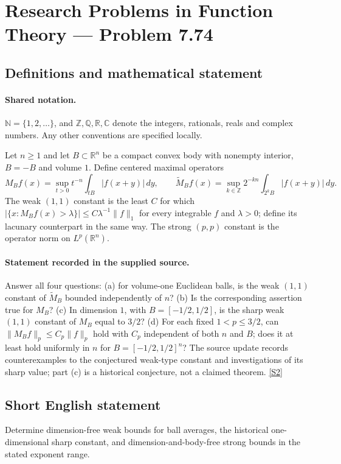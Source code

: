 \documentclass[11pt]{article}
\newcommand{\sref}[2]{\hyperlink{source:#1:#2}{[S#2]}}
\begin{document}
\section{Research Problems in Function Theory — Problem 7.74}\label{statement}

\subsection{Definitions and mathematical statement}

\paragraph{Shared notation.}$\mathbb N=\{1,2,\ldots\}$, and $\mathbb Z,\mathbb Q,\mathbb R,\mathbb C$ denote the integers, rationals, reals and complex numbers. Any other conventions are specified locally.


Let $n\ge1$ and let $B\subset\mathbb R^n$ be a compact convex body with nonempty interior, $B=-B$ and volume $1$. Define centered maximal operators
\[M_Bf(x)=\sup_{t>0}t^{-n}\int_{tB}|f(x+y)|\,dy,
\qquad \widetilde M_Bf(x)=\sup_{k\in\mathbb Z}2^{-kn}\int_{2^kB}|f(x+y)|\,dy.
\]
The weak $(1,1)$ constant is the least $C$ for which $|\{x:M_Bf(x)>\lambda\}|\le C\lambda^{-1}\|f\|_1$ for every integrable $f$ and $\lambda>0$; define its lacunary counterpart in the same way. The strong $(p,p)$ constant is the operator norm on $L^p(\mathbb R^n)$.
\paragraph{Statement recorded in the supplied source.}
Answer all four questions: (a) for volume-one Euclidean balls, is the weak $(1,1)$ constant of $\widetilde M_B$ bounded independently of $n$? (b) Is the corresponding assertion true for $M_B$? (c) In dimension $1$, with $B=[-1/2,1/2]$, is the sharp weak $(1,1)$ constant of $M_B$ equal to $3/2$? (d) For each fixed $1<p\le3/2$, can $\|M_Bf\|_p\le C_p\|f\|_p$ hold with $C_p$ independent of both $n$ and $B$; does it at least hold uniformly in $n$ for $B=[-1/2,1/2]^n$? The source update records counterexamples to the conjectured weak-type constant and investigations of its sharp value; part (c) is a historical conjecture, not a claimed theorem. \sref{statement}{2}
\subsection{Short English statement}
Determine dimension-free weak bounds for ball averages, the historical one-dimensional sharp constant, and dimension-and-body-free strong bounds in the stated exponent range.
\end{document}
